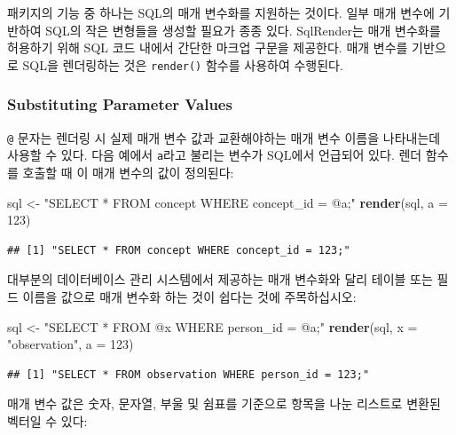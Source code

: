 \documentclass[11pt]{book}
\newenvironment{Shaded}{\begin{snugshade}}{\end{snugshade}}
\newcommand{\KeywordTok}[1]{\textcolor[rgb]{0.13,0.29,0.53}{\textbf{#1}}}
\newcommand{\DataTypeTok}[1]{\textcolor[rgb]{0.13,0.29,0.53}{#1}}
\newcommand{\DecValTok}[1]{\textcolor[rgb]{0.00,0.00,0.81}{#1}}
\newcommand{\StringTok}[1]{\textcolor[rgb]{0.31,0.60,0.02}{#1}}
\newcommand{\NormalTok}[1]{#1}
\theoremstyle{definition}
\theoremstyle{definition}
\theoremstyle{definition}
\theoremstyle{remark}
\begin{document}
패키지의 기능 중 하나는 SQL의 매개 변수화를 지원하는 것이다. 일부 매개
변수에 기반하여 SQL의 작은 변형들을 생성할 필요가 종종 있다. SqlRender는
매개 변수화를 허용하기 위해 SQL 코드 내에서 간단한 마크업 구문을
제공한다. 매개 변수를 기반으로 SQL을 렌더링하는 것은 \texttt{render()}
함수를 사용하여 수행된다. 

\subsubsection*{Substituting Parameter
Values}\label{substituting-parameter-values}

\texttt{@} 문자는 렌더링 시 실제 매개 변수 값과 교환해야하는 매개 변수
이름을 나타내는데 사용할 수 있다. 다음 예에서 \texttt{a}라고 불리는
변수가 SQL에서 언급되어 있다. 렌더 함수를 호출할 때 이 매개 변수의 값이
정의된다:

\begin{Shaded}
\begin{Highlighting}[]
\NormalTok{sql <-}\StringTok{ "SELECT * FROM concept WHERE concept_id = @a;"}
\KeywordTok{render}\NormalTok{(sql, }\DataTypeTok{a =} \DecValTok{123}\NormalTok{)}
\end{Highlighting}
\end{Shaded}

\begin{verbatim}
## [1] "SELECT * FROM concept WHERE concept_id = 123;"
\end{verbatim}

대부분의 데이터베이스 관리 시스템에서 제공하는 매개 변수화와 달리 테이블
또는 필드 이름을 값으로 매개 변수화 하는 것이 쉽다는 것에 주목하십시오:

\begin{Shaded}
\begin{Highlighting}[]
\NormalTok{sql <-}\StringTok{ "SELECT * FROM @x WHERE person_id = @a;"}
\KeywordTok{render}\NormalTok{(sql, }\DataTypeTok{x =} \StringTok{"observation"}\NormalTok{, }\DataTypeTok{a =} \DecValTok{123}\NormalTok{)}
\end{Highlighting}
\end{Shaded}

\begin{verbatim}
## [1] "SELECT * FROM observation WHERE person_id = 123;"
\end{verbatim}

매개 변수 값은 숫자, 문자열, 부울 및 쉼표를 기준으로 항목을 나눈
리스트로 변환된 벡터일 수 있다:
\end{document}

